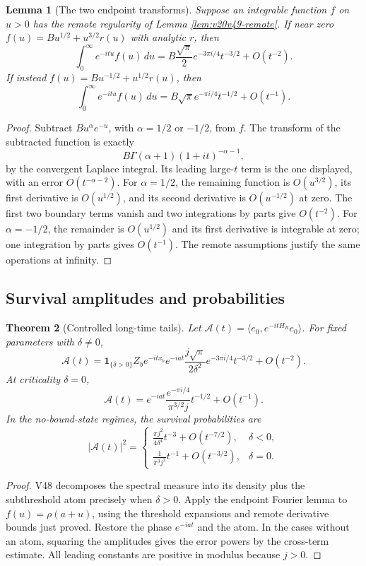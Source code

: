 \documentclass[11pt]{article}
\newtheorem{theorem}{Theorem}[section]
\newtheorem{lemma}[theorem]{Lemma}
\theoremstyle{remark}
\begin{document}
\begin{lemma}[The two endpoint transforms]
\label{lem:v20v49-Fourier}
Suppose an integrable function \(f\) on \(u>0\) has the remote
regularity of Lemma \ref{lem:v20v49-remote}.
If near zero \(f(u)=B u^{1/2}+u^{3/2}r(u)\) with analytic
\(r\), then
\[
 \int_0^\infty e^{-itu}f(u)\,du
 =B\frac{\sqrt\pi}{2}e^{-3\pi i/4}t^{-3/2}+O(t^{-2}).
\]
If instead \(f(u)=B u^{-1/2}+u^{1/2}r(u)\), then
\[
 \int_0^\infty e^{-itu}f(u)\,du
 =B\sqrt\pi e^{-\pi i/4}t^{-1/2}+O(t^{-1}).
\]
\end{lemma}
\begin{proof}
Subtract \(B u^\alpha e^{-u}\), with \(\alpha=1/2\) or
\(-1/2\), from \(f\).  The transform of the subtracted
function is exactly
\[
 B\Gamma(\alpha+1)(1+it)^{-\alpha-1},
\]
by the convergent Laplace integral.  Its leading large-\(t\)
term is the one displayed, with an error
\(O(t^{-\alpha-2})\).
For \(\alpha=1/2\), the remaining function is \(O(u^{3/2})\),
its first derivative is \(O(u^{1/2})\), and its second derivative
is \(O(u^{-1/2})\) at zero.  The first two boundary terms
vanish and two integrations by parts give \(O(t^{-2})\).
For \(\alpha=-1/2\), the remainder is \(O(u^{1/2})\) and
its first derivative is integrable at zero; one integration
by parts gives \(O(t^{-1})\).
The remote assumptions justify the same operations at infinity.
\end{proof}

\subsection{Survival amplitudes and probabilities}

\begin{theorem}[Controlled long-time tails]
\label{thm:v20v49-tails}
Let \(\mathcal A(t)=\langle e_0,e^{-itH_R}e_0\rangle\).
For fixed parameters with \(\delta\neq0\),
\[
 \mathcal A(t)=
 \mathbf1_{\{\delta>0\}}Z_b e^{-itx_b}
 e^{-iat}\frac{j\sqrt\pi}{2\delta^2}
 e^{-3\pi i/4}t^{-3/2}+O(t^{-2}).
\]
At criticality \(\delta=0\),
\[
 \mathcal A(t)=e^{-iat}\frac{e^{-\pi i/4}}{\pi^{3/2}j}
 t^{-1/2}+O(t^{-1}).
\]
In the no-bound-state regimes, the survival probabilities are
\[
 |\mathcal A(t)|^2=
 \begin{cases}
 \displaystyle \frac{\pi j^2}{4\delta^4}t^{-3}
                        +O(t^{-7/2}),&\delta<0,\\
 \displaystyle \frac1{\pi^3j^2}t^{-1}
                        +O(t^{-3/2}),&\delta=0.
 \end{cases}
\]
\end{theorem}
\begin{proof}
V48 decomposes the spectral measure into its density plus
the subthreshold atom precisely when \(\delta>0\).
Apply the endpoint Fourier lemma to
\(f(u)=\rho(a+u)\), using the threshold expansions and
remote derivative bounds just proved.  Restore the phase
\(e^{-iat}\) and the atom.  In the cases without an atom,
squaring the amplitudes gives the error powers by the
cross-term estimate.  All leading constants are positive
in modulus because \(j>0\).
\end{proof}
\end{document}
